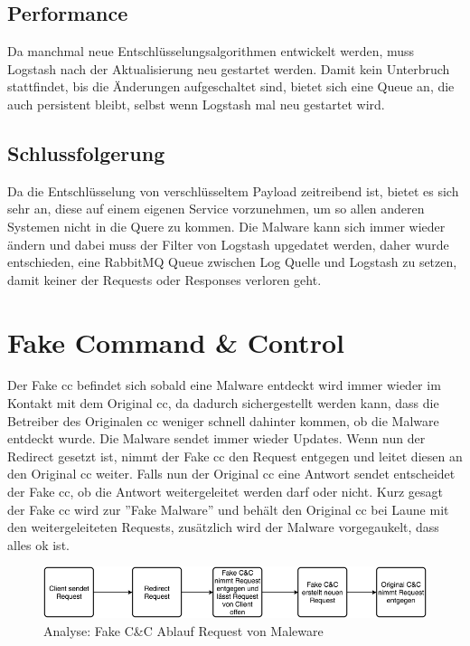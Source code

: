 \subsection{Performance}
Da manchmal neue Entschlüsselungsalgorithmen entwickelt werden, muss Logstash nach der Aktualisierung neu gestartet werden.
Damit kein Unterbruch stattfindet, bis die Änderungen aufgeschaltet sind, bietet sich eine Queue an, die auch persistent bleibt, selbst wenn Logstash mal neu gestartet wird.

\subsection{Schlussfolgerung}
Da die Entschlüsselung von verschlüsseltem Payload zeitreibend ist, bietet es sich sehr an, diese auf einem eigenen Service vorzunehmen, um so allen anderen Systemen nicht in die Quere zu kommen.
Die Malware kann sich immer wieder ändern und dabei muss der Filter von Logstash upgedatet werden, daher wurde entschieden, eine RabbitMQ\cite{elastic:logstash:rabbitmq} Queue zwischen Log Quelle und Logstash zu setzen, damit keiner der Requests oder Responses verloren geht.




\section{Fake Command \& Control}
\label{analyse:fakecc}
Der Fake \gls{cc} befindet sich sobald eine Malware entdeckt wird immer wieder im Kontakt mit dem Original \gls{cc}, da dadurch sichergestellt werden kann, dass die Betreiber des Originalen \gls{cc} weniger schnell dahinter kommen, ob die Malware entdeckt wurde.
Die Malware sendet immer wieder Updates. Wenn nun der Redirect gesetzt ist, nimmt der Fake \gls{cc} den Request entgegen und leitet diesen an den Original \gls{cc} weiter.
Falls nun der Original \gls{cc} eine Antwort sendet entscheidet der Fake \gls{cc}, ob die Antwort weitergeleitet werden darf oder nicht.
Kurz gesagt der Fake \gls{cc} wird zur ''Fake Malware'' und behält den Original \gls{cc} bei Laune mit den weitergeleiteten Requests, zusätzlich wird der Malware vorgegaukelt, dass alles ok ist.

\begin{figure}[H]
	\centering
	\includegraphics[width=\textwidth]{img/FakeCC-Request}
	\caption{Analyse: Fake C\&C Ablauf Request von Maleware}
	\label{fig:fakecc-request}
\end{figure}

